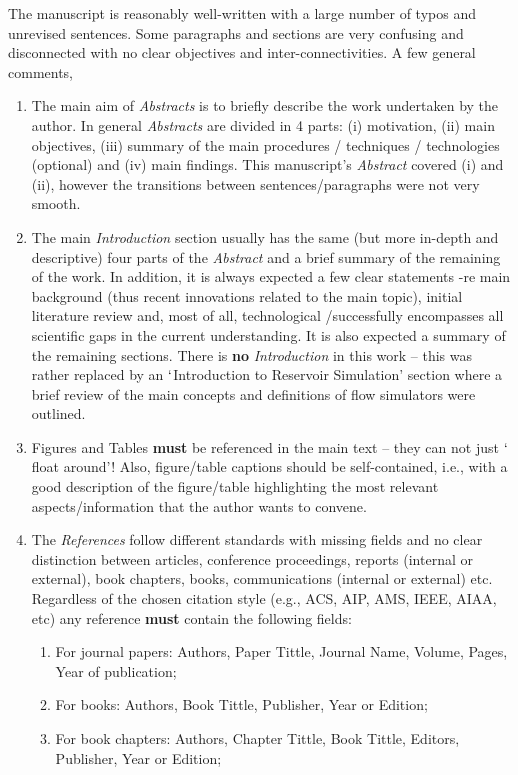 \documentclass[14pt,twoside]{report}
\begin{document}
The manuscript is reasonably well-written with a large number of typos and unrevised sentences. Some paragraphs and sections are very confusing and disconnected with no clear objectives and inter-connectivities. A few general comments,
\begin{enumerate}
\item The main aim of {\it Abstracts} is to briefly describe the work undertaken by the author. In general {\it Abstracts} are divided in 4 parts: (i) motivation, (ii) main objectives, (iii) summary of the main procedures / techniques / technologies (optional) and (iv) main findings. This manuscript's {\it Abstract} covered (i) and (ii), however the transitions between sentences/paragraphs were not very smooth.
%
\item The main {\it Introduction} section usually has the same (but more in-depth and descriptive) four parts of the {\it Abstract} and a brief summary of the remaining of the work. In addition, it is always expected a few clear statements -re main background (thus recent innovations related to the main topic), initial literature review and, most of all, technological /successfully encompasses all scientific gaps in the current understanding. It is also expected a summary of the remaining sections. There is {\bf no} {\it Introduction} in this work -- this was rather replaced by an $\lq$Introduction to Reservoir Simulation' section where a brief review of the main concepts and definitions of flow simulators were outlined. 
%
\item Figures and Tables {\bf must} be referenced in the main text -- they can not just $\lq$float around'! Also, figure/table captions should be self-contained, i.e., with a good description of the figure/table highlighting the most relevant aspects/information that the author wants to convene. 
%
\item The {\it References} follow different standards with missing fields and no clear distinction between articles, conference proceedings, reports (internal or external), book chapters, books, communications (internal or external) etc.  Regardless of the chosen citation style (e.g., ACS, AIP, AMS, IEEE, AIAA, etc) any reference {\bf must} contain the following fields: 
\begin{enumerate}
\item For journal papers: Authors, Paper Tittle, Journal Name, Volume, Pages, Year of publication;
\item For books: Authors, Book Tittle, Publisher, Year or Edition;
\item For book chapters: Authors, Chapter Tittle, Book Tittle, Editors, Publisher, Year or Edition;

\end{enumerate}
\end{enumerate}
\end{document}
